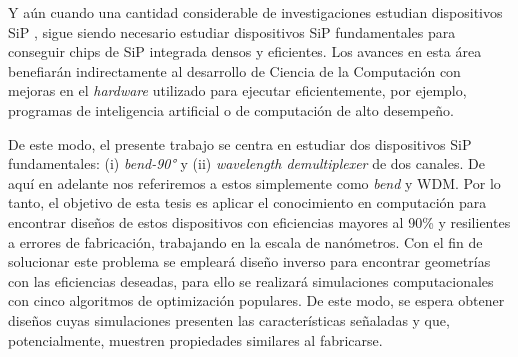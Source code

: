 Y aún cuando una cantidad considerable de investigaciones estudian dispositivos
SiP \citep{Su2018, Malheiros-Silveira2020}, sigue siendo necesario estudiar dispositivos SiP
fundamentales para conseguir chips de SiP integrada densos y eficientes.
Los avances en esta área benefiarán indirectamente al desarrollo de Ciencia de
la Computación con mejoras en el \emph{hardware} utilizado para ejecutar
eficientemente, por
ejemplo, programas de inteligencia artificial o de computación de alto
desempeño.

De este modo, el presente trabajo se centra en estudiar dos dispositivos SiP
fundamentales:
(i) \emph{bend-90°} y (ii) \emph{wavelength demultiplexer} de dos canales.
De aquí en adelante nos referiremos a estos simplemente como \emph{bend} y WDM.
Por lo tanto, el objetivo de esta tesis es aplicar el conocimiento en computación para
encontrar diseños de estos dispositivos con eficiencias mayores al 90\%
y resilientes a errores de fabricación, trabajando en la escala de nanómetros.
Con el fin de solucionar este problema se empleará diseño inverso para encontrar geometrías con las eficiencias deseadas, 
para ello se realizará simulaciones computacionales con cinco algoritmos de optimización populares. 
De este modo, se espera obtener diseños cuyas simulaciones presenten las características señaladas y 
que, potencialmente, muestren propiedades similares al fabricarse.








